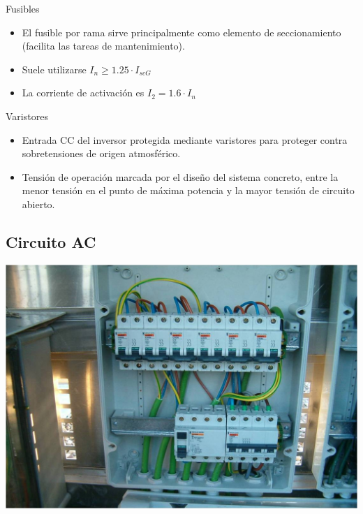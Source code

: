 \documentclass[xcolor={usenames,svgnames,dvipsnames}]{beamer}
\begin{document}
\begin{frame}[label={sec:org271d234}]{Fusibles}
\begin{itemize}
\item El \alert{fusible por rama} sirve principalmente como \alert{elemento de
seccionamiento} (facilita las tareas de mantenimiento).

\item Suele utilizarse \(I_{n} \geq 1.25\cdot I_{scG}\)

\item La corriente de activación es \(I_{2}=1.6\cdot I_{n}\)
\end{itemize}
\end{frame}

\begin{frame}[label={sec:org806af35}]{Varistores}
\begin{itemize}
\item Entrada CC del inversor protegida mediante \alert{varistores} para
proteger contra sobretensiones de origen atmosférico.

\item Tensión de operación marcada por el diseño del sistema concreto,
entre la menor tensión en el punto de máxima potencia y la mayor
tensión de circuito abierto.
\end{itemize}
\end{frame}


\subsection{Circuito AC}
\label{sec:org957e023}
\begin{frame}[label={sec:org6faaa54}]{}
\begin{center}
\includegraphics[width=.9\linewidth]{../figs/CajaAC.jpg}
\end{center}
\end{frame}
\end{document}

